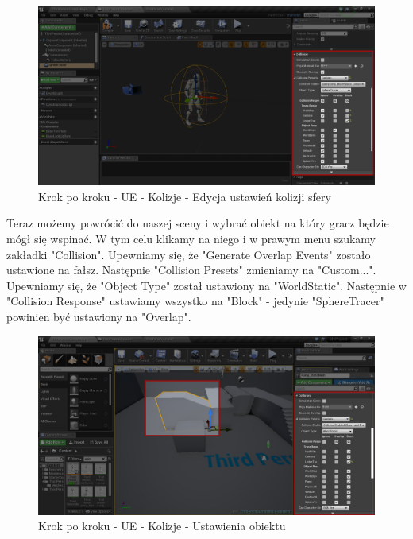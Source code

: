 \documentclass[brudnopis]{xmgr}
\begin{document}
\begin{figure}[!htb]
    \begin{center}
    \includegraphics[scale=0.35]{Screeny/UeKrokPoKroku/UE-Climb-Sphere03.png}
    \end{center}
    \caption{Krok po kroku - UE - Kolizje - Edycja ustawień kolizji sfery}
\end{figure}

Teraz możemy powrócić do naszej sceny i wybrać obiekt na który gracz będzie mógł się wspinać. W tym celu klikamy na niego i w prawym menu szukamy zakładki "Collision". Upewniamy się, że "Generate Overlap Events" zostało ustawione na fałsz. Następnie "Collision Presets" zmieniamy na "Custom...". Upewniamy się, że "Object Type" został ustawiony na "WorldStatic". Następnie w "Collision Response" ustawiamy wszystko na "Block" - jedynie "SphereTracer" powinien być ustawiony na "Overlap".

\begin{figure}[!htb]
    \begin{center}
    \includegraphics[scale=0.35]{Screeny/UeKrokPoKroku/UE-Climb-ObjectCollision}
    \end{center}
    \caption{Krok po kroku - UE - Kolizje - Ustawienia obiektu}
\end{figure}
\end{document}
